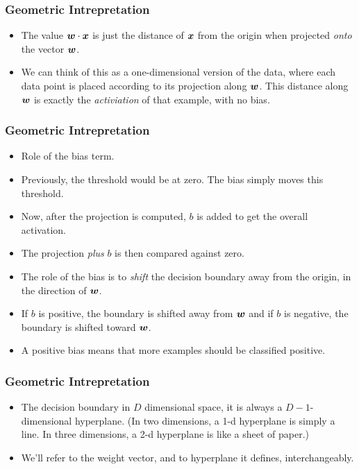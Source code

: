 \documentclass[trans]{beamer}
\begin{document}
\begin{frame}
  \frametitle{Geometric Intrepretation}
\begin{itemize}
\item
The value ${\boldsymbol{w}} \cdot {\boldsymbol{x}}$
is just the distance of ${\boldsymbol{x}}$ from the origin when projected
\emph{onto} the vector ${\boldsymbol{w}}$.
\item We can think of this as a
one-dimensional version of the data, where each data point is placed
according to its projection along ${\boldsymbol{w}}$.  This distance along ${\boldsymbol{w}}$ is
exactly the \emph{activiation} of that example, with no bias.
\end{itemize}
\end{frame}

\begin{frame}
  \frametitle{Geometric Intrepretation}
\begin{itemize}
\item
Role of the bias term.
\item 
Previously, the threshold would be at zero.  
 The bias simply moves
this threshold. 
\item Now, after the projection is computed, $b$ is added
to get the overall activation.
\item  The projection \emph{plus} $b$ is then
compared against zero.
\item The role of the bias is to
\emph{shift} the decision boundary away from the origin, in the
direction of ${\boldsymbol{w}}$.  
\item If $b$ is
positive, the boundary is shifted away from ${\boldsymbol{w}}$ and if $b$ is
negative, the boundary is shifted toward ${\boldsymbol{w}}$.  
\item A positive
bias means that more examples should be classified positive. 
\end{itemize}
\end{frame}

\begin{frame}
  \frametitle{Geometric Intrepretation}
\begin{itemize}
\item
The decision boundary in
$D$ dimensional space, it is always a $D-1$-dimensional hyperplane.
(In two dimensions, a 1-d hyperplane is simply a line.  In three
dimensions, a 2-d hyperplane is like a sheet of paper.) 
\item We'll
refer to the weight vector, and to hyperplane it defines,
interchangeably.
\end{itemize}
\end{frame}
\end{document}
